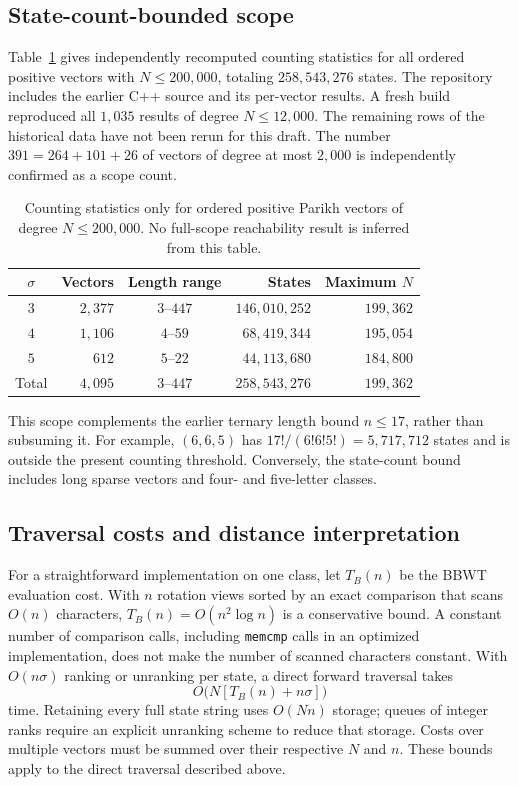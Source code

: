 \documentclass[11pt,a4paper]{article}
\theoremstyle{definition}
\begin{document}
\subsection{State-count-bounded scope}
Table~\ref{tab:exhaustive-search} gives independently recomputed counting statistics for all ordered positive vectors with $N\le200{,}000$, totaling $258{,}543{,}276$ states. The repository includes the earlier C++ source and its per-vector results. A fresh build reproduced all $1{,}035$ results of degree $N\le12{,}000$. The remaining rows of the historical data have not been rerun for this draft. The number $391=264+101+26$ of vectors of degree at most $2{,}000$ is independently confirmed as a scope count.

\begin{table}[t]
\centering\small
\caption{Counting statistics only for ordered positive Parikh vectors of degree $N\le200{,}000$. No full-scope reachability result is inferred from this table.}
\label{tab:exhaustive-search}
\begin{tabular}{@{}crcrr@{}}
\toprule
$\sigma$ & Vectors & Length range & States & Maximum $N$ \\
\midrule
$3$ & $2{,}377$ & $3$--$447$ & $146{,}010{,}252$ & $199{,}362$ \\
$4$ & $1{,}106$ & $4$--$59$ & $68{,}419{,}344$ & $195{,}054$ \\
$5$ & $612$ & $5$--$22$ & $44{,}113{,}680$ & $184{,}800$ \\
\midrule
Total & $4{,}095$ & $3$--$447$ & $258{,}543{,}276$ & $199{,}362$ \\
\bottomrule
\end{tabular}
\end{table}

This scope complements the earlier ternary length bound $n\le17$, rather than subsuming it. For example, $(6,6,5)$ has $17!/(6!6!5!)=5{,}717{,}712$ states and is outside the present counting threshold. Conversely, the state-count bound includes long sparse vectors and four- and five-letter classes.

\subsection{Traversal costs and distance interpretation}
For a straightforward implementation on one class, let $T_B(n)$ be the BBWT evaluation cost. With $n$ rotation views sorted by an exact comparison that scans $O(n)$ characters, $T_B(n)=O(n^2\log n)$ is a conservative bound. A constant number of comparison calls, including \texttt{memcmp} calls in an optimized implementation, does not make the number of scanned characters constant. With $O(n\sigma)$ ranking or unranking per state, a direct forward traversal takes
\[
O\bigl(N[T_B(n)+n\sigma]\bigr)
\]
time. Retaining every full state string uses $O(Nn)$ storage; queues of integer ranks require an explicit unranking scheme to reduce that storage. Costs over multiple vectors must be summed over their respective $N$ and $n$. These bounds apply to the direct traversal described above.
\end{document}
